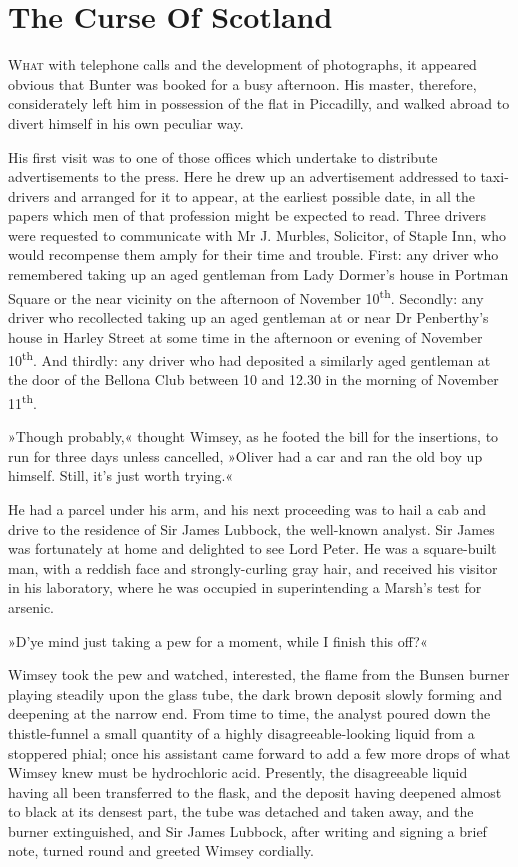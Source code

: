 \chapter{The Curse Of Scotland}

\lettrine[lines=4]{W}{hat} with telephone calls and the development of photographs, it appeared obvious that Bunter was booked for a busy afternoon. His master, therefore, considerately left him in possession of the flat in Piccadilly, and walked abroad to divert himself in his own peculiar way.

His first visit was to one of those offices which undertake to distribute advertisements to the press. Here he drew up an advertisement addressed to taxi-drivers and arranged for it to appear, at the earliest possible date, in all the papers which men of that profession might be expected to read. Three drivers were requested to communicate with Mr J. Murbles, Solicitor, of Staple Inn, who would recompense them amply for their time and trouble. First: any driver who remembered taking up an aged gentleman from Lady Dormer's house in Portman Square or the near vicinity on the afternoon of November  10\textsuperscript{th}. Secondly: any driver who recollected taking up an aged gentleman at or near Dr Penberthy's house in Harley Street at some time in the afternoon or evening of November  10\textsuperscript{th}. And thirdly: any driver who had deposited a similarly aged gentleman at the door of the Bellona Club between 10 and 12.30 in the morning of November  11\textsuperscript{th}.

»Though probably,« thought Wimsey, as he footed the bill for the insertions, to run for three days unless cancelled, »Oliver had a car and ran the old boy up himself. Still, it's just worth trying.«

He had a parcel under his arm, and his next proceeding was to hail a cab and drive to the residence of Sir James Lubbock, the well-known analyst. Sir James was fortunately at home and delighted to see Lord Peter. He was a square-built man, with a reddish face and strongly-curling gray hair, and received his visitor in his laboratory, where he was occupied in superintending a Marsh's test for arsenic.

»D'ye mind just taking a pew for a moment, while I finish this off?«

Wimsey took the pew and watched, interested, the flame from the Bunsen burner playing steadily upon the glass tube, the dark brown deposit slowly forming and deepening at the narrow end. From time to time, the analyst poured down the thistle-funnel a small quantity of a highly disagreeable-looking liquid from a stoppered phial; once his assistant came forward to add a few more drops of what Wimsey knew must be hydrochloric acid. Presently, the disagreeable liquid having all been transferred to the flask, and the deposit having deepened almost to black at its densest part, the tube was detached and taken away, and the burner extinguished, and Sir James Lubbock, after writing and signing a brief note, turned round and greeted Wimsey cordially.

